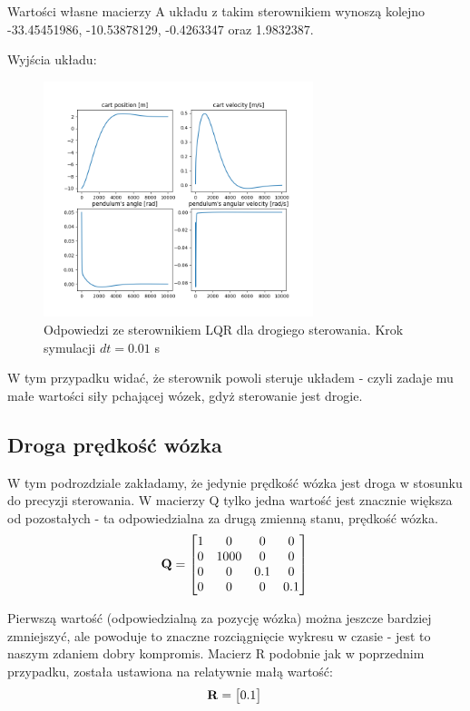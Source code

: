 \documentclass{article}
\begin{document}
Wartości własne macierzy A układu z takim sterownikiem wynoszą kolejno -33.45451986, -10.53878129, -0.4263347 oraz 1.9832387.

Wyjścia układu:
\begin{figure}[H]
    \centering
    \includegraphics[width=0.7\textwidth]{img/pierwszy.png}
    \caption{Odpowiedzi ze sterownikiem LQR dla drogiego sterowania. Krok symulacji $dt=0.01$ s}
    \label{fig:state_space}
\end{figure}

W tym przypadku widać, że sterownik powoli steruje układem - czyli zadaje mu małe wartości siły pchającej wózek, gdyż sterowanie jest drogie.

\subsection{Droga prędkość wózka}
W tym podrozdziale zakładamy, że jedynie prędkość wózka jest droga w stosunku do precyzji sterowania. W macierzy Q tylko jedna wartość jest znacznie większa od pozostałych - ta odpowiedzialna za drugą zmienną stanu, prędkość wózka.
\begin{equation}\label{eq:q1}
\mathbf{Q} = \begin{bmatrix}  1 & 0 & 0 & 0 \\
  							  0 & 1000 & 0 & 0 \\
  							  0 & 0 & 0.1 & 0 \\
  							  0 & 0 & 0 & 0.1 \\ 
  			   \end{bmatrix} \\ \\
\end{equation}

Pierwszą wartość (odpowiedzialną za pozycję wózka) można jeszcze bardziej zmniejszyć, ale powoduje to znaczne rozciągnięcie wykresu w czasie - jest to naszym zdaniem dobry kompromis. Macierz R podobnie jak w poprzednim przypadku, została ustawiona na relatywnie małą wartość:
\begin{equation}\label{eq:r1}
\mathbf{R} = \begin{bmatrix}  0.1
  			   \end{bmatrix} \\ \\
\end{equation}
\end{document}
